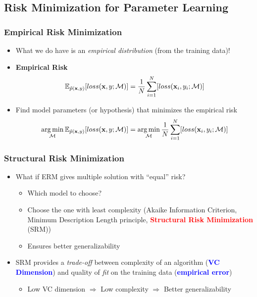 \documentclass[10pt]{beamer}
\DeclareMathOperator*{\argmin}{arg\,min}
\begin{document}
\subsection{Risk Minimization for Parameter Learning}
\begin{frame}
\frametitle{Empirical Risk Minimization}
\begin{itemize}
  \item What we do have is an {\em empirical distribution} (from the training data)!
  \item {\bf Empirical Risk}
    \[
    \mathbb{E}_{\tilde{p}({\bf x},y)}[loss({\bf x},y;\mathcal{M})] = \frac{1}{N}\sum_{i=1}^N[loss({\bf x}_i,y_i;\mathcal{M})]
    \]
  \item Find model parameters (or hypothesis) that minimizes the empirical risk
    \[
    \argmin_{\mathcal{M}} \mathbb{E}_{\tilde{p}({\bf x},y)}[loss({\bf x},y;\mathcal{M})] = \argmin_{\mathcal{M}}\frac{1}{N}\sum_{i=1}^N[loss({\bf x}_i,y_i;\mathcal{M})]
    \]
\end{itemize}
\end{frame}
\begin{frame}
\frametitle{Structural Risk Minimization}
\begin{itemize}
\item What if ERM gives multiple solution with ``equal'' risk?
  \begin{itemize}
    \item Which model to choose?
      
    \item<2-> Choose the one with least complexity (Akaike Information Criterion, Minimum Description Length principle, \textcolor{red}{\bf Structural Risk Minimization} (SRM))
    \item<2-> Ensures better generalizability
  \end{itemize}
\item<3-> SRM provides a {\em trade-off} between complexity of an algorithm (\textcolor{blue}{\bf VC Dimension}) and quality of {\em fit} on the training data (\textcolor{blue}{\bf empirical error})
  \begin{itemize}
    \item Low VC dimension $\Rightarrow$ Low complexity $\Rightarrow$ Better generalizability
  \end{itemize}
\end{itemize}
\end{frame}
\end{document}
